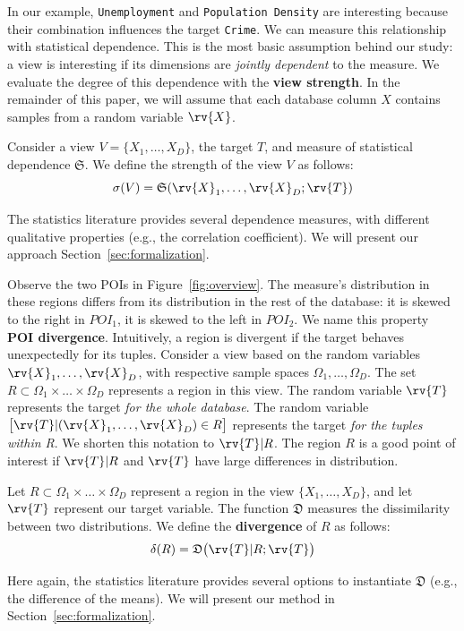 In our example, \texttt{Unemployment} and \texttt{Population Density} are
interesting because their combination influences the target \texttt{Crime}. We
can measure this relationship with statistical dependence. This is the most
basic assumption behind our study: a view is interesting if its dimensions are
\emph{jointly dependent} to the measure. We evaluate the degree of this
dependence with the \textbf{view strength}. In the remainder of this paper, we
will assume that each database column $X$ contains samples from a random
variable $\rv{X}$.
\begin{definition}
    Consider a view $V = \{X_1, \ldots, X_D\}$, the target $T$, and measure of
    statistical dependence $\mathfrak{S}$.   We
    define the strength of the view $V$ as follows:
    \begin{equation}\label{eq:strengthgen}
        \sigma(V) = \mathfrak{S}(\rv{X}_1, \ldots, \rv{X}_D ; \rv{T})
    \end{equation}
\end{definition}
The statistics literature provides several dependence measures, with different
qualitative properties (e.g., the correlation coefficient). We will present our
approach Section~\ref{sec:formalization}.

Observe the two POIs in Figure~\ref{fig:overview}.  The measure's distribution
in these regions differs from its distribution in the rest of the database: it
is skewed to the right in $POI_1$, it is skewed to the left in $POI_2$. We name
this property \textbf{POI divergence}. Intuitively, a region is divergent if
the target behaves unexpectedly for its tuples.  Consider a view based on the
random variables $\rv{X}_1, \ldots, \rv{X}_D$, with respective sample spaces
$\Omega_1, \ldots, \Omega_D$.  The set $R\subset \Omega_1 \times \ldots \times
\Omega_D$ represents a region in this view.  The random variable $\rv{T}$
represents the target \emph{for the whole database}.  The random variable
$\big[ \rv{T} | (\rv{X}_1, \ldots, \rv{X}_D) \in R \big] $ represents the
target \emph{for the tuples within R}. We shorten this notation to $\rv{T} |
R$. The region $R$ is a good point of interest if $\rv{T} |R $ and $\rv{T}$
have large differences in distribution.
\begin{definition}
    Let $R\subset \Omega_1 \times \ldots \times \Omega_D$ represent a region in
    the view $\{X_1, \ldots, X_D\}$, and let $\rv{T}$ represent our target
    variable. The function $\mathfrak{D}$ measures the dissimilarity between
    two distributions. We define the \textbf{divergence} of $R$ as follows: 
\begin{equation}\label{eq:divergencegen}
    \delta(R) = \mathfrak{D} \big( \rv{T} | R;  \rv{T}\big)
\end{equation}
\end{definition}
Here again, the statistics literature provides several options to instantiate
$\mathfrak{D}$ (e.g., the difference of the means). We will present our method
in Section~\ref{sec:formalization}.

